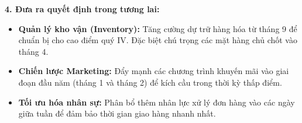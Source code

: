 \vspace{0.3cm}
\noindent\textbf{4. Đưa ra quyết định trong tương lai:}
\begin{itemize}
    \item \textbf{Quản lý kho vận (Inventory):} Tăng cường dự trữ hàng hóa từ tháng 9 để chuẩn bị cho cao điểm quý IV. Đặc biệt chú trọng các mặt hàng chủ chốt vào tháng 4.
    \item \textbf{Chiến lược Marketing:} Đẩy mạnh các chương trình khuyến mãi vào giai đoạn đầu năm (tháng 1 và tháng 2) để kích cầu trong thời kỳ thấp điểm.
    \item \textbf{Tối ưu hóa nhân sự:} Phân bổ thêm nhân lực xử lý đơn hàng vào các ngày giữa tuần để đảm bảo thời gian giao hàng nhanh nhất.
\end{itemize}

